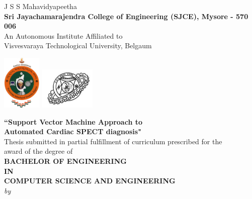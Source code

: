 \documentclass[11pt,a4paper]{report}
\begin{document}
\begin{titlepage}

\begin{center}





J S S Mahavidyapeetha \\
\textbf{Sri Jayachamarajendra College of Engineering (SJCE), Mysore - 570 006} \\
An Autonomous Institute Affiliated to \\
Visvesvaraya Technological University, Belgaum \\
\end{center}
\smallskip



\hspace{1.0cm}
\includegraphics[width=0.14\textwidth]{./VTU_logo.png} 
\hspace{8.2cm}
\includegraphics[width=0.20\textwidth]{./sjce.jpg} 	\\[0.2cm]



\begin{center}
{\Large \textbf{``Support Vector Machine Approach to}} \\
{\Large \textbf{Automated Cardiac SPECT diagnosis"}} \\[0.2cm]
Thesis submitted in partial fulfillment of curriculum prescribed for the \\
award of the degree of \\[0.3cm]
\textbf{BACHELOR OF ENGINEERING} \\
\textbf{IN}\\
\textbf{COMPUTER SCIENCE AND ENGINEERING} \\[0.3cm]
\emph{by} \\



\end{center}
\end{titlepage}
\end{document}
